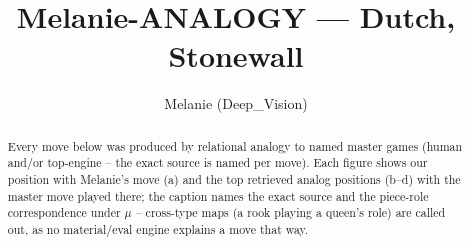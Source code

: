 \documentclass[11pt]{article}
\title{Melanie-ANALOGY — Dutch, Stonewall}
\author{Melanie (Deep\_Vision)}
\date{}
\begin{document}
\maketitle

\begin{abstract}Every move below was produced by relational analogy to named master games (human and/or top-engine -- the exact source is named per move). Each figure shows our position with Melanie's move (a) and the top retrieved analog positions (b--d) with the master move played there; the caption names the exact source and the piece-role correspondence under $\mu$ -- cross-type maps (a rook playing a queen's role) are called out, as no material/eval engine explains a move that way.\end{abstract}

\begin{figure}[p]\centering
\begin{subfigure}{0.46\textwidth}\centering
\resizebox{\linewidth}{!}{%
\newchessgame
\chessboard[
  setfen={rnbqk2r/pp4pp/2pbpn2/3p1p2/2PP4/5NP1/PP2PPBP/RNBQ1RK1 w kq - 0 7},
  showmover=false,
  pgfstyle=straightmove, color=movearrow, markmove={c4-d5}
]}
\caption{}
\end{subfigure}\hfill
\begin{subfigure}{0.46\textwidth}\centering
\resizebox{\linewidth}{!}{%
\newchessgame
\chessboard[
  setfen={1nbqk2r/1p3ppp/r2bpn2/p7/1pPP4/P4NP1/5PBP/RNBQ1RK1 w k - 4 11},
  showmover=false,
  pgfstyle=straightmove, color=movearrow, markmove={a3-b4}
]}
\caption{}
\end{subfigure}
\\[4pt]
\begin{subfigure}{0.46\textwidth}\centering
\resizebox{\linewidth}{!}{%
\newchessgame
\chessboard[
  setfen={rnbq1rk1/pp2ppbp/3p1np1/2p5/3PP3/2P2N1P/PPB2PP1/RNBQK2R b KQ - 0 7},
  showmover=false,
  pgfstyle=straightmove, color=movearrow, markmove={c5-d4}
]}
\caption{}
\end{subfigure}\hfill
\begin{subfigure}{0.46\textwidth}\centering
\resizebox{\linewidth}{!}{%
\newchessgame
\chessboard[
  setfen={rnbq1rk1/pp2ppbp/3p1np1/2p5/3PP3/2P2N1P/PPB2PP1/RNBQK2R b KQ - 0 7},
  showmover=false,
  pgfstyle=straightmove, color=movearrow, markmove={c5-d4}
]}
\caption{}
\end{subfigure}

\end{figure}
\end{document}
